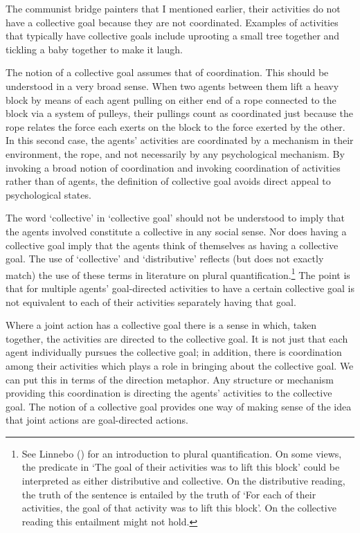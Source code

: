 \documentclass[12pt,a4paper]{extarticle}
\begin{document}
The communist bridge painters that I mentioned earlier, their activities do not have a collective goal because they are not coordinated.
Examples of activities that typically have collective goals include uprooting a small tree together and tickling a baby together to make it laugh.

The notion of a collective goal assumes that of coordination.  This should be understood in a very broad sense.  
When two agents between them lift a heavy block by means of each agent pulling on either end of a rope connected to the block via a system of pulleys, their pullings count as coordinated just because the rope relates the force each exerts on the block to the force exerted by the other.  
In this second case, the agents' activities are coordinated by a mechanism in their environment, the rope, and not necessarily by any psychological mechanism.  
By invoking a broad notion of coordination 
and invoking coordination of activities rather than of agents,
the definition of collective goal avoids direct appeal to psychological states.


The word `collective' in `collective goal' should not be understood to imply that the agents  involved constitute a collective in any social sense.  Nor does having a collective goal imply that the agents think of themselves as having a collective goal.  The use of `collective' and `distributive' reflects  (but does not exactly match) the use of these terms in literature on plural quantification.\footnote{
See Linnebo (\citeyear{Linnebo:2005ig}) for an introduction to plural quantification.  On some views, the predicate in `The goal of their activities was to lift this block' could be interpreted as either distributive and collective.  On the distributive reading, the truth of the sentence is entailed by the truth of `For each of their activities, the goal of that activity was to lift this block'.  On the collective reading this entailment might not hold.
}
The point is that for multiple agents' goal-directed activities to have a certain collective goal is not equivalent to each of their activities separately having that goal.


Where a joint action has a collective goal there is a sense in which, taken together, the activities are directed to the collective goal.  It is not just that each agent individually pursues the collective goal; in addition, there is coordination among their activities which plays a role in bringing about the collective goal.  We can put this in terms of the direction metaphor.  Any structure or mechanism providing this coordination is directing the agents' activities to the collective goal.  The notion of a collective goal provides one way of making sense of the idea that joint actions are goal-directed actions.
\end{document}

